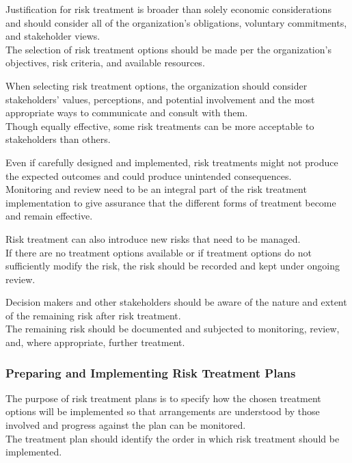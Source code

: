 \documentclass[letterpaper,10pt,english]{jupyterBook}
\begin{document}
\sphinxAtStartPar
Justification for risk treatment is broader than solely economic considerations and should consider all of the organization’s obligations, voluntary commitments, and stakeholder views. \\
The selection of risk treatment options should be made per the organization’s objectives, risk criteria, and available resources.

\sphinxAtStartPar
When selecting risk treatment options, the organization should consider stakeholders’ values, perceptions, and potential involvement and the most appropriate ways to communicate and consult with them. \\
Though equally effective, some risk treatments can be more acceptable to stakeholders than others.

\sphinxAtStartPar
Even if carefully designed and implemented, risk treatments might not produce the expected outcomes and could produce unintended consequences. \\
Monitoring and review need to be an integral part of the risk treatment implementation to give assurance that the different forms of treatment become and remain effective.

\sphinxAtStartPar
Risk treatment can also introduce new risks that need to be managed. \\
If there are no treatment options available or if treatment options do not sufficiently modify the risk, the risk should be recorded and kept under ongoing review.

\sphinxAtStartPar
Decision makers and other stakeholders should be aware of the nature and extent of the remaining risk after risk treatment. \\
The remaining risk should be documented and subjected to monitoring, review, and, where appropriate, further treatment.


\subsubsection{Preparing and Implementing Risk Treatment Plans}
\label{\detokenize{PM/rm:preparing-and-implementing-risk-treatment-plans}}
\sphinxAtStartPar
The purpose of risk treatment plans is to specify how the chosen treatment options will be implemented so that arrangements are understood by those involved and progress against the plan can be monitored. \\
The treatment plan should identify the order in which risk treatment should be implemented.
\end{document}
